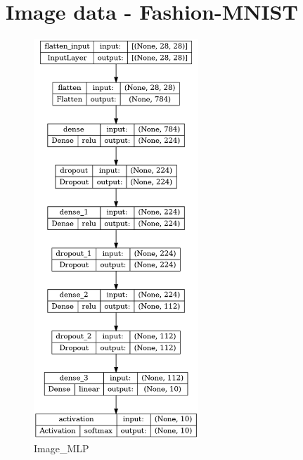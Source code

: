 \section{Image data - Fashion-MNIST}
\begin{figure}[!hb]
    \centering
    \begin{minipage}{0.5\textwidth}
        \centering
        \includegraphics[width=6.2cm]{obrazky-figures/model-plots/Image_MLP.png} %
        \caption{Image\_MLP}
    \end{minipage}\hfill
    \begin{minipage}{0.5\textwidth}
        \centering

\end{minipage}
\end{figure}
